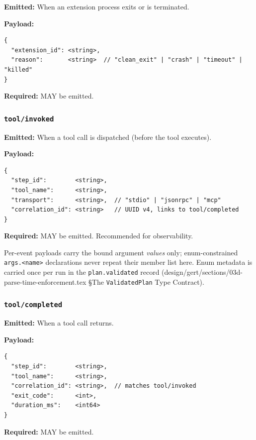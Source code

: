 \textbf{Emitted:} When an extension process exits or is terminated.

\textbf{Payload:}
\begin{verbatim}
{
  "extension_id": <string>,
  "reason":       <string>  // "clean_exit" | "crash" | "timeout" | "killed"
}
\end{verbatim}

\textbf{Required:} MAY be emitted.


\subsubsection{\texttt{tool/invoked}}

\textbf{Emitted:} When a tool call is dispatched (before the tool executes).

\textbf{Payload:}
\begin{verbatim}
{
  "step_id":        <string>,
  "tool_name":      <string>,
  "transport":      <string>,  // "stdio" | "jsonrpc" | "mcp"
  "correlation_id": <string>   // UUID v4, links to tool/completed
}
\end{verbatim}

\textbf{Required:} MAY be emitted. Recommended for observability.

Per-event payloads carry the bound argument \emph{values} only; enum-constrained
\texttt{args.<name>} declarations never repeat their member list here. Enum
metadata is carried once per run in the \texttt{plan.validated} record
(design/gert/sections/03d-parse-time-enforcement.tex \S The
\texttt{ValidatedPlan} Type Contract).


\subsubsection{\texttt{tool/completed}}

\textbf{Emitted:} When a tool call returns.

\textbf{Payload:}
\begin{verbatim}
{
  "step_id":        <string>,
  "tool_name":      <string>,
  "correlation_id": <string>,  // matches tool/invoked
  "exit_code":      <int>,
  "duration_ms":    <int64>
}
\end{verbatim}

\textbf{Required:} MAY be emitted.

